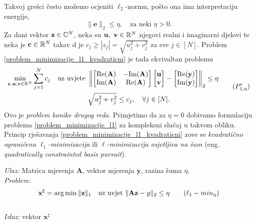 \documentclass[a4paper,twoside,12pt]{memoir} %
\newcommand{\vect}[1]{\mathbf{#1}}
\renewcommand{\vec}{\vect}
\newcommand{\norm}[1]{\|{#1}\|}
\newcommand{\norms}[1]{\left\lVert#1\right\rVert}
\DeclareMathOperator*{\argmin}{arg\,min}
\renewcommand{\Re}{\text{\normalfont{Re}}}
\renewcommand{\Im}{\text{\normalfont{Im}}}
\newenvironment{alg}[1]
{
    \bigskip
    \begin{tcolorbox}[arc=0mm,boxrule=1.2pt,colframe=black,colback=white,detach title, before upper={\medskip\begin{center}\textbf{#1}\end{center}\hline\newline\medskip},frame hidden]
    \medskip
}
{
    \medskip
\end{tcolorbox}
    \bigskip
}
\begin{document}
Takvoj gre\v{s}ci \v{c}esto mo\v{z}emo ocjeniti $\ell_2$-normu, po\v{s}to ona ima interpretaciju energije,
\begin{equation*}
    \norm{\vec e}_2 \leq \eta, \quad \text{za neki } \eta > 0.
\end{equation*}
Za dani vektor $\vec z \in \C^N$, neka su $\vec u,\ \vec v \in \R^N$ njegovi realni i imaginarni djelovi te neka je $\vec c \in \R^N$ takav d je $c_j \geq |z_j| = \sqrt{u_j^2+v_j^2}$ za sve $j \in [N]$. Problem \eqref{problem_minimizacije_l1_kvadraticni} je tada ekvivaltan problemu
\begin{equation}
\begin{split}
    \min_{\vec c, \vec u, \vec v \in \R^N}\sum_{j=1}^N c_j\quad \text{uz uvjete }& 
    \norms{
        \begin{bmatrix*}
            \Re(\vec A) & -\Im(\vec A) \\
            \Im(\vec A) & \Re(\vec A)
        \end{bmatrix*}
        \begin{bmatrix*}
           \vec u \\ \vec v 
        \end{bmatrix*}
        -
        \begin{bmatrix*}
            \Re(\vec y) \\ \Im(\vec y) 
    \end{bmatrix*} }_2 \leq \eta \\
    &\sqrt{u_j^2 + v_j^2} \leq c_j,\quad \forall j \in [N].
\end{split}\tag{$P_{1, \eta}'$}\label{problem_minimizacije_l1_kvadraticni_drugi_oblik}
\end{equation}
Ovo je \textit{problem konike drugog reda}. Primjetimo da za $\eta=0$ dobivamo formulaciju problema \eqref{problem_minimizacije_l1} za kompleksni slu\v{c}aj u takvom obliku.
\\\indent Princip rje\v{s}avanja \eqref{problem_minimizacije_l1_kvadraticni} zove se \textit{kvadrati\v{c}no ograni\v{c}ena $\ell_1$-minimizacija} ili \textit{$\ell$-minimizacija osjetljiva na \v{s}um} (eng. \textit{quadratically constrainted basis pursuit}).
\begin{alg}{Kvadrati\v{c}no ograni\v{c}ena $\ell_1$-minimizacija}
    \textit{Ulaz:} Matrica mjerenja $\vec A$, vektor mjerenja $\vec y$, razina \v{s}uma $\eta$. \\
    \textit{Problem:}
        \begin{equation}
            \vec x^{\sharp} = \argmin \norm{\vec z}_1 \quad \text{uz uvjet }\norm{\vec{Az}-y}_2 \leq \eta\tag{$\ell_1-min_{\eta}$}\label{algoritam_l1_minimizacija_kvadraticna}
        \end{equation} \\
        \textit{Izlaz:} vektor $\vec x^{\sharp}$
\end{alg}
\end{document}
